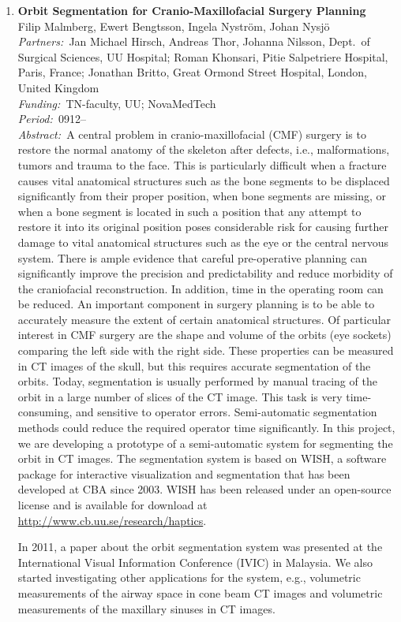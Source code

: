 \documentclass[10pt, a4paper]{article}
\newcommand{\aabstract}[1]{\emph{Abstract:~}#1}
\newcommand{\ffunding}[1]{\emph{Funding:~}#1\\}
\newcommand{\ppartners}[1]{\emph{Partners:~}#1\\}
\newcommand{\pperiod}[1]{\emph{Period:~}#1\\}
\begin{document}
\begin{enumerate}
\item
\label{project:orbit_segmentation}
\textbf{Orbit Segmentation for Cranio-Maxillofacial Surgery Planning}\\
Filip Malmberg, Ewert Bengtsson, Ingela Nystr{\"o}m, Johan Nysj\"{o}\\
\ppartners{Jan Michael Hirsch, Andreas Thor, Johanna Nilsson, Dept.~of Surgical Sciences, UU Hospital; Roman Khonsari, Pitie Salpetriere Hospital, Paris, France; Jonathan Britto, Great Ormond Street Hospital, London, United Kingdom}
\ffunding{TN-faculty, UU; NovaMedTech}
\pperiod{0912--}
\aabstract{A central problem in cranio-maxillofacial (CMF) surgery is to restore the normal anatomy of the skeleton after defects, i.e., malformations, tumors and trauma to the face. This is particularly difficult when a fracture causes vital anatomical structures such as the bone segments to be displaced significantly from their proper position, when bone segments are missing, or when a bone segment is located in such a position that any attempt to restore it into its original position poses considerable risk for causing further damage to vital anatomical structures such as the eye or the central nervous system. There is ample evidence that careful pre-operative planning can significantly improve the precision and predictability and reduce morbidity of the craniofacial reconstruction. In addition, time in the operating room can be reduced. An important component in surgery planning is to be able to accurately measure the extent of certain anatomical structures. Of particular interest in CMF surgery are the shape and volume of the orbits (eye sockets) comparing the left side with the right side. These properties can be measured in CT images of the skull, but this requires accurate segmentation of the orbits. Today, segmentation is usually performed by manual tracing of the orbit in a large number of slices of the CT image. This task is very time-consuming, and sensitive to operator errors. Semi-automatic segmentation methods could reduce the required operator time significantly. In this project, we are developing a prototype of a semi-automatic system for segmenting the orbit in CT images. The segmentation system is based on WISH, a software package for interactive visualization and segmentation that has been developed at CBA since 2003. WISH has been released under an open-source license and is available for download at \url{http://www.cb.uu.se/research/haptics}.

In 2011, a paper about the orbit segmentation system was presented at the International Visual Information Conference (IVIC) in Malaysia. We also started investigating other applications for the system, e.g., volumetric measurements of the airway space in cone beam CT images and volumetric measurements of the maxillary sinuses in CT images.

}
\end{enumerate}
\end{document}
